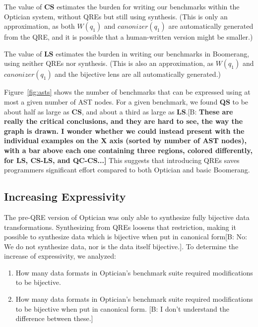 \documentclass[acmsmall,review,anonymous]{acmart}
\newcommand{\FINISH}[3]{\ifdraft\textcolor{#1}{[#2: #3]}\fi}
\newcommand{\bcp}[1]{\FINISH{dkred}{B}{#1}}
\newcommand{\BCP}[1]{\FINISH{dkred}{B}{\bf #1}}
\newcommand{\kw}[1]{\ensuremath{\mathit{#1}}}
\newcommand{\canonizer}{\ensuremath{\kw{canonizer}}}
\newcommand{\QRESize}{\textbf{QS}}
\newcommand{\CanonizerAndSpecSize}{\textbf{CS}}
\newcommand{\LensAndSpecSize}{\textbf{LS}}
\begin{document}
The value of \CanonizerAndSpecSize{} estimates the burden for writing our
benchmarks within the Optician system, without QREs but still using
synthesis. (This is only an approximation, as both $W(q_1)$ and $\canonizer(q_1)$ are
automatically generated from the QRE, and it is possible that a human-written
version might be smaller.)

The value of \LensAndSpecSize{} estimates the burden in writing our benchmarks
in Boomerang, using neither QREs nor synthesis. (This is also an
approximation, as $W(q_1)$ and $\canonizer(q_1)$ and the bijective lens are all
automatically generated.)

Figure~\ref{fig:asts} shows the number of benchmarks that can be expressed using
at most a given number of AST nodes. For a given benchmark, we found \QRESize{}
to be about half as large as \CanonizerAndSpecSize, and about a third as large
as \LensAndSpecSize{}.\BCP{These are really the critical conclusions, and
  they are hard to see, the way the graph is drawn.  I wonder whether we
  could instead present with the individual examples on the X axis (sorted
  by number of AST nodes), with a bar above each one containing three
  regions, colored differently, for LS, CS-LS, and QC-CS...} This suggests
that introducing QREs saves programmers 
significant effort compared to both Optician and basic Boomerang.

\subsection{Increasing Expressivity}

The pre-QRE version of Optician was only able to synthesize fully bijective data
transformations.  Synthesizing from QREs loosens that restriction, making it
possible to synthesize data which is bijective when put in canonical
form\bcp{No: We do not synthesize data, nor is the data itself bijective.}. To
determine the increase of expressivity, we analyzed:
\begin{enumerate}
  \item How many data formats in Optician's benchmark suite required modifications
  to be bijective.
  \item How many data formats in Optician's benchmark suite required modifications
  to be bijective when put in canonical form.  \bcp{I don't understand the
    difference between these.}
\end{enumerate}
\end{document}
